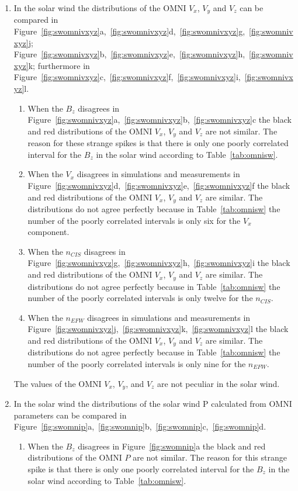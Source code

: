 \documentclass[linenumbers,draft]{agujournal}
\begin{document}
\begin{enumerate}
\item In the solar wind the distributions of the OMNI $V_{x}$, $V_{y}$ and $V_{z}$ can be compared in Figure~\ref{fig:swomnivxyz}a,~\ref{fig:swomnivxyz}d,~\ref{fig:swomnivxyz}g,~\ref{fig:swomnivxyz}j; Figure~\ref{fig:swomnivxyz}b,~\ref{fig:swomnivxyz}e,~\ref{fig:swomnivxyz}h,~\ref{fig:swomnivxyz}k; furthermore in Figure~\ref{fig:swomnivxyz}c,~\ref{fig:swomnivxyz}f,~\ref{fig:swomnivxyz}i,~\ref{fig:swomnivxyz}l.
\begin{enumerate} 
\item When the $B_{z}$ disagrees in Figure~\ref{fig:swomnivxyz}a,~\ref{fig:swomnivxyz}b,~\ref{fig:swomnivxyz}c the black and red distributions of the OMNI $V_{x}$, $V_{y}$ and $V_{z}$ are not similar. The reason for these strange spikes is that there is only one poorly correlated interval for the $B_{z}$ in the solar wind according to Table~\ref{tab:omnisw}.

\item When the $V_{x}$ disagrees in simulations and measurements in Figure~\ref{fig:swomnivxyz}d,~\ref{fig:swomnivxyz}e,~\ref{fig:swomnivxyz}f the black and red distributions of the OMNI $V_{x}$, $V_{y}$ and $V_{z}$ are similar. The distributions do not agree perfectly because in Table~\ref{tab:omnisw} the number of the poorly correlated intervals is only six for the $V_{x}$ component.
 
\item When the $n_{CIS}$ disagrees in Figure~\ref{fig:swomnivxyz}g,~\ref{fig:swomnivxyz}h,~\ref{fig:swomnivxyz}i the black and red distributions of the OMNI $V_{x}$, $V_{y}$ and $V_{z}$ are similar. The distributions do not agree perfectly because in Table~\ref{tab:omnisw} the number of the poorly correlated intervals is only twelve for the $n_{CIS}$.

\item When the $n_{EFW}$ disagrees in simulations and measurements in Figure~\ref{fig:swomnivxyz}j,~\ref{fig:swomnivxyz}k,~\ref{fig:swomnivxyz}l the black and red distributions of the OMNI $V_{x}$, $V_{y}$ and $V_{z}$ are similar. The distributions do not agree perfectly because in Table~\ref{tab:omnisw} the number of the poorly correlated intervals is only nine for the $n_{EFW}$.
\end{enumerate}
The values of the OMNI $V_{x}$, $V_{y}$, and $V_{z}$ are not peculiar in the solar wind. 
 
\item In the solar wind the distributions of the solar wind P calculated from OMNI parameters can be compared in Figure~\ref{fig:swomnip}a,~\ref{fig:swomnip}b,~\ref{fig:swomnip}c,~\ref{fig:swomnip}d.
\begin{enumerate}
\item When the $B_{z}$ disagrees in Figure~\ref{fig:swomnip}a the black and red distributions of the OMNI $P$ are not similar. The reason for this strange spike is that there is only one poorly correlated interval for the $B_{z}$ in the solar wind according to Table~\ref{tab:omnisw}.
  

\end{enumerate}
\end{enumerate}
\end{document}
